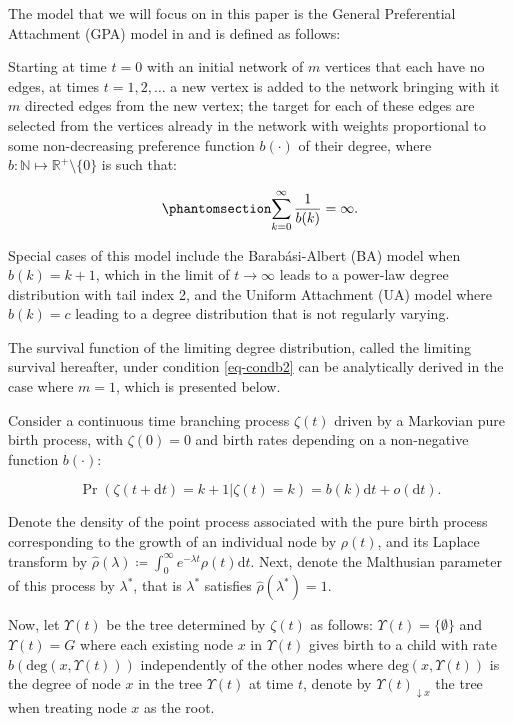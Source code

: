 \documentclass[
  sn-basic,
  10pt,
]{sn-jnl}
\theoremstyle{plain}
\theoremstyle{plain}
\theoremstyle{remark}
\begin{document}
The model that we will focus on in this paper is the General
Preferential Attachment (GPA) model in \citet{rudas07} and is defined as
follows:

Starting at time \(t=0\) with an initial network of \(m\) vertices that
each have no edges, at times \(t=1,2,\ldots\) a new vertex is added to
the network bringing with it \(m\) directed edges from the new vertex;
the target for each of these edges are selected from the vertices
already in the network with weights proportional to some non-decreasing
preference function \(b(\cdot)\) of their degree, where
\(b: \mathbb N \mapsto \mathbb R^+\setminus\{0\}\) is such that:

\begin{equation}\phantomsection\label{eq-condb2}{
\sum_{k=0}^\infty\frac{1}{b(k)} = \infty.
}\end{equation}

Special cases of this model include the Barab\'asi-Albert (BA) model when $b(k) = k+1$, which in the limit of $t\rightarrow \infty$ leads to a power-law degree distribution with tail index 2, and the Uniform Attachment (UA) model where $b(k)=c$ leading to a degree distribution that is not regularly varying.

The survival function of the limiting degree distribution, called the
limiting survival hereafter, under condition \ref{eq-condb2} can be
analytically derived in the case where \(m=1\), which is presented
below.

Consider a continuous time branching process \(\zeta(t)\) driven by a
Markovian pure birth process, with \(\zeta(0)=0\) and birth rates
depending on a non-negative function \(b(\cdot)\):

\[
\Pr(\zeta(t+\text{d}t)=k+1|\zeta(t)=k) = b(k)\text{d}t + o(\text{d}t).
\]

Denote the density of the point process associated with the pure birth
process corresponding to the growth of an individual node by
\(\rho(t)\), and its Laplace transform by
\(\hat \rho(\lambda)\coloneq \int_0^\infty e^{-\lambda t}\rho(t)\text{d}t\).
Next, denote the Malthusian parameter of this process by \(\lambda^*\),
that is \(\lambda^*\) satisfies \(\hat\rho(\lambda^*) = 1\).

Now, let \(\Upsilon(t)\) be the tree determined by \(\zeta(t)\) as
follows: \(\Upsilon(t)=\{\emptyset\}\) and \(\Upsilon(t)=G\) where each
existing node \(x\) in \(\Upsilon(t)\) gives birth to a child with rate
\(b(\mathrm{deg}(x, \Upsilon(t)))\) independently of the other nodes
where \(\mathrm{deg}(x, \Upsilon(t))\) is the degree of node \(x\) in
the tree \(\Upsilon(t)\) at time \(t\), denote by
\(\Upsilon(t)_{\downarrow x}\) the tree when treating node \(x\) as the
root.
\end{document}
